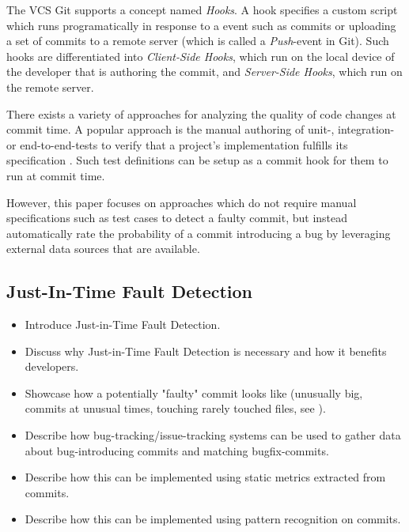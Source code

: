 The VCS Git supports a concept named \textit{Hooks}. A hook specifies a custom script which runs programatically in response to a event such as commits or uploading a set of commits to a remote server (which is called a \textit{Push}-event in Git). Such hooks are differentiated into \textit{Client-Side Hooks}, which run on the local device of the developer that is authoring the commit, and \textit{Server-Side Hooks}, which run on the remote server. \cite{Chacon:2014:PG:2695634}

There exists a variety of approaches for analyzing the quality of code changes at commit time. A popular approach is the manual authoring of unit-, integration- or end-to-end-tests to verify that a project's implementation fulfills its specification \cite{Maayan2018}. Such test definitions can be setup as a commit hook for them to run at commit time.

However, this paper focuses on approaches which do not require manual specifications such as test cases to detect a faulty commit, but instead automatically rate the probability of a commit introducing a bug by leveraging external data sources that are available.

\subsection{Just-In-Time Fault Detection}
\begin{itemize}
	\item Introduce Just-in-Time Fault Detection.
	\item Discuss why Just-in-Time Fault Detection is necessary and how it benefits developers.
	\item Showcase how a potentially "faulty" commit looks like (unusually big, commits at unusual times, touching rarely touched files, see \cite{Goyal2017}).
	\item Describe how bug-tracking/issue-tracking systems can be used to gather data about bug-introducing commits and matching bugfix-commits.
	\item Describe how this can be implemented using static metrics extracted from commits.
	\item Describe how this can be implemented using pattern recognition on commits.
\end{itemize}

